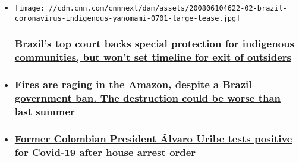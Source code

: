 \begin{itemize}
\item
  \href{/2020/08/08/americas/brazil-supreme-court-indigenous-ruling-intl/index.html}{}

  \texttt{[image: //cdn.cnn.com/cnnnext/dam/assets/200806104622-02-brazil-coronavirus-indigenous-yanomami-0701-large-tease.jpg]}

  \hypertarget{brazils-top-court-backs-special-protection-for-indigenous-communities-but-wont-set-timeline-for-exit-of-outsiders}{%
  \subsubsection{\texorpdfstring{\href{/2020/08/08/americas/brazil-supreme-court-indigenous-ruling-intl/index.html}{Brazil's
  top court backs special protection for indigenous communities, but
  won't set timeline for exit of
  outsiders}}{Brazil's top court backs special protection for indigenous communities, but won't set timeline for exit of outsiders}}\label{brazils-top-court-backs-special-protection-for-indigenous-communities-but-wont-set-timeline-for-exit-of-outsiders}}
\item
  \hypertarget{fires-are-raging-in-the-amazon-despite-a-brazil-government-ban-the-destruction-could-be-worse-than-last-summer}{%
  \subsubsection{\texorpdfstring{\href{/2020/08/07/americas/brazil-bolsonaro-amazon-fires-intl/index.html}{Fires
  are raging in the Amazon, despite a Brazil government ban. The
  destruction could be worse than last
  summer}}{Fires are raging in the Amazon, despite a Brazil government ban. The destruction could be worse than last summer}}\label{fires-are-raging-in-the-amazon-despite-a-brazil-government-ban-the-destruction-could-be-worse-than-last-summer}}
\item
  \hypertarget{former-colombian-president-uxe1lvaro-uribe-tests-positive-for-covid-19-after-house-arrest-order}{%
  \subsubsection{\texorpdfstring{\href{/2020/08/05/americas/colombia-uribe-detention-intl/index.html}{Former
  Colombian President Álvaro Uribe tests positive for Covid-19 after
  house arrest
  order}}{Former Colombian President Álvaro Uribe tests positive for Covid-19 after house arrest order}}\label{former-colombian-president-uxe1lvaro-uribe-tests-positive-for-covid-19-after-house-arrest-order}}
\end{itemize}

